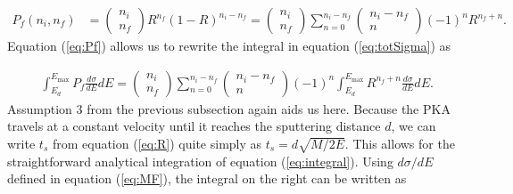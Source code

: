 \documentclass{article}
\begin{document}
\begin{equation}
  \begin{aligned}
    P_f(n_i, n_f)
    &=
    \begin{pmatrix}
      n_i\\n_f
    \end{pmatrix}
    R^{n_f}(1-R)^{n_i - n_f}
    =
    \begin{pmatrix}
      n_i\\n_f
    \end{pmatrix}
    \sum^{n_i-n_f}_{n=0}
    \begin{pmatrix}
      n_i-n_f\\n
    \end{pmatrix}
    (-1)^n R^{n_f+n}.
  \end{aligned}
  \label{eq:Pf}
\end{equation}
%
Equation (\ref{eq:Pf}) allows us to rewrite the integral in equation
(\ref{eq:totSigma}) as

\begin{equation}
  \begin{aligned}
    &\int_{E_d}^{E_\text{max}}
    P_f \frac{d\sigma}{dE} dE
    =
    \begin{pmatrix}
      n_i\\n_f
    \end{pmatrix}
    \sum^{n_i-n_f}_{n=0}
    \begin{pmatrix}
      n_i-n_f\\n
    \end{pmatrix}
    (-1)^n
    \int^{E_\text{max}}_{E_d}
    R^{n_f+n}
    \frac{d\sigma}{dE}
    dE.
  \end{aligned}
  \label{eq:integral}
\end{equation}
%
Assumption 3 from the previous subsection again aids us here.
Because the PKA travels at a constant velocity until it reaches the sputtering
distance $d$, we can write $t_s$ from equation (\ref{eq:R}) quite simply as
$t_s = d\sqrt{M/2E}$.
This allows for the straightforward analytical integration of equation
(\ref{eq:integral}).  Using $d\sigma/dE$ defined in equation (\ref{eq:MF}), the
integral on the right can be written as
\end{document}
